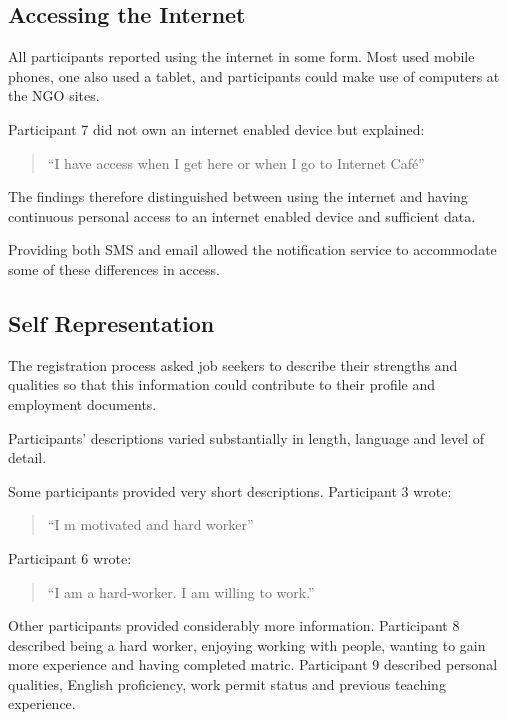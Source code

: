 \subsection{Accessing the Internet}

All participants reported using the internet in some form. Most used mobile phones, one also used a tablet, and participants could make use of computers at the NGO sites.

Participant 7 did not own an internet enabled device but explained:

\begin{quote}
``I have access when I get here or when I go to Internet Café''
\end{quote}

The findings therefore distinguished between using the internet and having continuous personal access to an internet enabled device and sufficient data.

Providing both SMS and email allowed the notification service to accommodate some of these differences in access.


\subsection{Self Representation}

The registration process asked job seekers to describe their strengths and qualities so that this information could contribute to their profile and employment documents.

Participants' descriptions varied substantially in length, language and level of detail.

Some participants provided very short descriptions. Participant 3 wrote:

\begin{quote}
``I m motivated and hard worker''
\end{quote}

Participant 6 wrote:

\begin{quote}
``I am a hard-worker. I am willing to work.''
\end{quote}

Other participants provided considerably more information. Participant 8 described being a hard worker, enjoying working with people, wanting to gain more experience and having completed matric. Participant 9 described personal qualities, English proficiency, work permit status and previous teaching experience.

